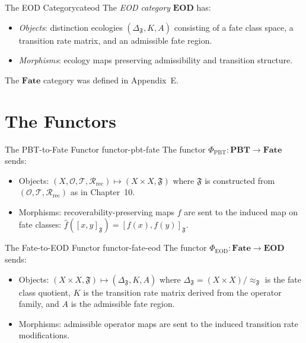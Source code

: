 \documentclass[12pt,twoside,openright]{book}
\newcommand{\transfam}{\mathcal{T}}       %
\newcommand{\recon}{\mathcal{R}_{\mathrm{rec}}}   %
\newcommand{\distPairs}{X\times X}
\newcommand{\fateClasses}{\Delta_{\mathfrak{F}}}
\newcommand{\obs}{\mathcal{O}}
\newcommand{\fateMap}{\mathfrak{F}}
\newcommand{\fateClass}[1]{[#1]_{\mathfrak{F}}}
\newcommand{\admRegion}{A}
\newcommand{\catFate}{\mathbf{Fate}}
\providecommand{\admRegion}{A}
\providecommand{\fateClasses}{\Delta_{\mathfrak{F}}}
\providecommand{\fateClass}[1]{[#1]_{\mathfrak{F}}}
\providecommand{\catFate}{\mathbf{Fate}}
\providecommand{\transRate}{K}
\providecommand{\catPBT}{\mathbf{PBT}}
\providecommand{\catEOD}{\mathbf{EOD}}
\providecommand{\functorPBT}{\Phi_{\mathrm{PBT}}}
\providecommand{\functorEOD}{\Phi_{\mathrm{EOD}}}
\begin{document}
\begin{definition}{The EOD Category}{cateod}
The \emph{EOD category} $\catEOD$ has:
\begin{itemize}[nosep,leftmargin=2em]
  \item \emph{Objects}: distinction ecologies
    $(\fateClasses, \transRate, \admRegion)$ consisting
    of a fate class space, a transition rate matrix, and
    an admissible fate region.
  \item \emph{Morphisms}: ecology maps preserving
    admissibility and transition structure.
\end{itemize}
\end{definition}

The $\catFate$ category was defined in Appendix~E.

\section{The Functors}

\begin{definition}{The PBT-to-Fate Functor}%
  {functor-pbt-fate}
The functor $\functorPBT:\catPBT\to\catFate$ sends:
\begin{itemize}[nosep,leftmargin=2em]
  \item Objects: $(X,\obs,\transfam,\recon)\mapsto
    (\distPairs,\fateMap)$ where $\fateMap$ is constructed
    from $(\obs,\transfam,\recon)$ as in Chapter~10.
  \item Morphisms: recoverability-preserving maps $f$
    are sent to the induced map on fate classes:
    $\hat{f}(\fateClass{x,y})=\fateClass{f(x),f(y)}$.
\end{itemize}
\end{definition}

\begin{definition}{The Fate-to-EOD Functor}%
  {functor-fate-eod}
The functor $\functorEOD:\catFate\to\catEOD$ sends:
\begin{itemize}[nosep,leftmargin=2em]
  \item Objects: $(\distPairs,\fateMap)\mapsto
    (\fateClasses,\transRate,\admRegion)$ where
    $\fateClasses=(X\times X)/{\approx_\fateMap}$ is the
    fate class quotient, $\transRate$ is the transition
    rate matrix derived from the operator family, and
    $\admRegion$ is the admissible fate region.
  \item Morphisms: admissible operator maps are sent to
    the induced transition rate modifications.
\end{itemize}
\end{definition}
\end{document}
